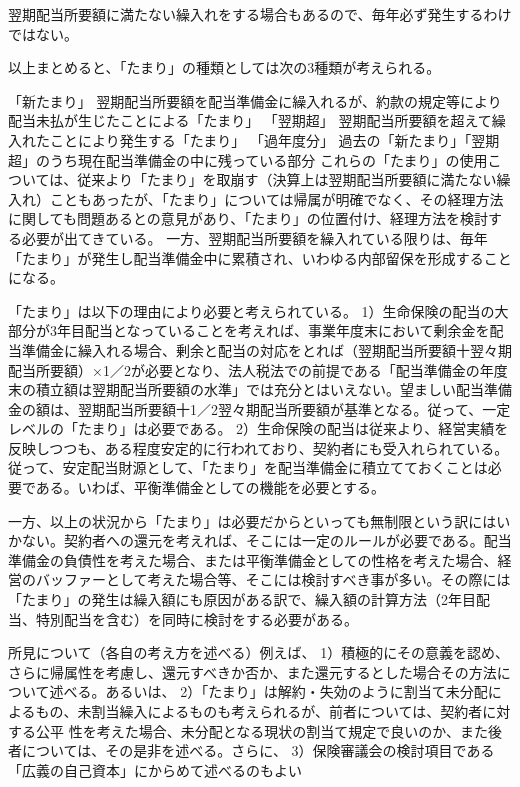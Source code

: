 \documentclass[report,gutter=10mm,fore-edge=10mm,uplatex,dvipdfmx]{jlreq}
\begin{document}
翌期配当所要額に満たない繰入れをする場合もあるので、毎年必ず発生するわけではない。

以上まとめると、「たまり」の種類としては次の3種類が考えられる。

「新たまり」 翌期配当所要額を配当準備金に繰入れるが、約款の規定等により配当未払が生じたことによる「たまり」
「翌期超」 翌期配当所要額を超えて繰入れたことにより発生する「たまり」
「過年度分」 過去の「新たまり」「翌期超」のうち現在配当準備金の中に残っている部分
これらの「たまり」の使用こついては、従来より「たまり」を取崩す（決算上は翌期配当所要額に満たない繰入れ）こともあったが、「たまり」については帰属が明確でなく、その経理方法に関しても問題あるとの意見があり、「たまり」の位置付け、経理方法を検討する必要が出てきている。
一方、翌期配当所要額を繰入れている限りは、毎年「たまり」が発生し配当準備金中に累積され、いわゆる内部留保を形成することになる。

「たまり」は以下の理由により必要と考えられている。
1）生命保険の配当の大部分が3年目配当となっていることを考えれば、事業年度末において剰余金を配当準備金に繰入れる場合、剰余と配当の対応をとれば（翌期配当所要額十翌々期配当所要額）×1／2が必要となり、法人税法での前提である「配当準備金の年度末の積立額は翌期配当所要額の水準」では充分とはいえない。望ましい配当準備金の額は、翌期配当所要額十1／2翌々期配当所要額が基準となる。従って、一定レベルの「たまり」は必要である。
2）生命保険の配当は従来より、経営実績を反映しつつも、ある程度安定的に行われており、契約者にも受入れられている。従って、安定配当財源として、「たまり」を配当準備金に積立てておくことは必要である。いわば、平衡準備金としての機能を必要とする。

一方、以上の状況から「たまり」は必要だからといっても無制限という訳にはいかない。契約者への還元を考えれば、そこには一定のルールが必要である。配当準備金の負債性を考えた場合、または平衡準備金としての性格を考えた場合、経営のバッファーとして考えた場合等、そこには検討すべき事が多い。その際には「たまり」の発生は繰入額にも原因がある訳で、繰入額の計算方法（2年目配当、特別配当を含む）を同時に検討をする必要がある。

所見について（各自の考え方を述べる）例えば、
1）積極的にその意義を認め、さらに帰属性を考慮し、還元すべきか否か、また還元するとした場合その方法について述べる。あるいは、
2）「たまり」は解約・失効のように割当て未分配によるもの、未割当繰入によるものも考えられるが、前者については、契約者に対する公平
性を考えた場合、未分配となる現状の割当て規定で良いのか、また後者については、その是非を述べる。さらに、
3）保険審議会の検討項目である「広義の自己資本」にからめて述べるのもよい
\end{document}
